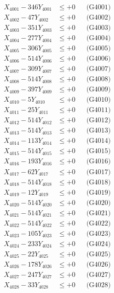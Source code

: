 \documentclass[a4paper,10pt]{article}
\begin{document}
{\begin{align}
\allowbreak
X_{4001} - 346Y_{4001} &\leq +0 && \text{(G4001)} \\
X_{4002} - 47Y_{4002} &\leq +0 && \text{(G4002)} \\
X_{4003} - 351Y_{4003} &\leq +0 && \text{(G4003)} \\
X_{4004} - 277Y_{4004} &\leq +0 && \text{(G4004)} \\
X_{4005} - 306Y_{4005} &\leq +0 && \text{(G4005)} \\
X_{4006} - 514Y_{4006} &\leq +0 && \text{(G4006)} \\
X_{4007} - 309Y_{4007} &\leq +0 && \text{(G4007)} \\
X_{4008} - 514Y_{4008} &\leq +0 && \text{(G4008)} \\
X_{4009} - 397Y_{4009} &\leq +0 && \text{(G4009)} \\
X_{4010} - 5Y_{4010} &\leq +0 && \text{(G4010)} \\
\allowbreak
X_{4011} - 25Y_{4011} &\leq +0 && \text{(G4011)} \\
X_{4012} - 514Y_{4012} &\leq +0 && \text{(G4012)} \\
X_{4013} - 514Y_{4013} &\leq +0 && \text{(G4013)} \\
X_{4014} - 113Y_{4014} &\leq +0 && \text{(G4014)} \\
X_{4015} - 514Y_{4015} &\leq +0 && \text{(G4015)} \\
X_{4016} - 193Y_{4016} &\leq +0 && \text{(G4016)} \\
X_{4017} - 62Y_{4017} &\leq +0 && \text{(G4017)} \\
X_{4018} - 514Y_{4018} &\leq +0 && \text{(G4018)} \\
X_{4019} - 12Y_{4019} &\leq +0 && \text{(G4019)} \\
X_{4020} - 514Y_{4020} &\leq +0 && \text{(G4020)} \\
\allowbreak
X_{4021} - 514Y_{4021} &\leq +0 && \text{(G4021)} \\
X_{4022} - 514Y_{4022} &\leq +0 && \text{(G4022)} \\
X_{4023} - 105Y_{4023} &\leq +0 && \text{(G4023)} \\
X_{4024} - 233Y_{4024} &\leq +0 && \text{(G4024)} \\
X_{4025} - 22Y_{4025} &\leq +0 && \text{(G4025)} \\
X_{4026} - 178Y_{4026} &\leq +0 && \text{(G4026)} \\
X_{4027} - 247Y_{4027} &\leq +0 && \text{(G4027)} \\
X_{4028} - 33Y_{4028} &\leq +0 && \text{(G4028)} \\

\end{align}}
\end{document}
